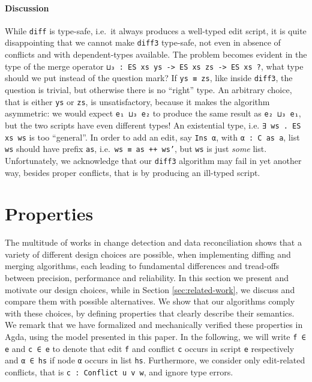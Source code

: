 \documentclass{sigplanconf}
\theoremstyle{plain}
\begin{document}

\paragraph{Discussion}
While \texttt{diff} is type-safe, i.e.\ it always produces a
well-typed edit script, it is quite disappointing that we cannot make
\texttt{diff3} type-safe, not even in absence of conflicts and with
dependent-types available.
%
The problem becomes evident in the type of the merge operator
\texttt{⊔₃ : ES xs ys -> ES xs zs -> ES xs ?}, what type should we put
instead of the question mark?
%
If \texttt{ys ≡ zs}, like inside \texttt{diff3}, the question is
trivial, but otherwise there is no ``right'' type.
%
An arbitrary choice, that is either \texttt{ys} or \texttt{zs}, is
unsatisfactory, because it makes the algorithm asymmetric: we would
expect \texttt{e₁ ⊔₃ e₂} to produce the same result as \texttt{e₂ ⊔₃
  e₁}, but the two scripts have even different types!
%
An existential type, i.e. \texttt{∃ ws . ES xs ws} is too ``general''.
In order to add an edit, say \texttt{Ins α}, with \texttt{α : C as a},
list \texttt{ws} should have prefix \texttt{as}, i.e.\ \texttt{ws ≡ as
  ++ ws'}, but \texttt{ws} is just \emph{some} list.
%
Unfortunately, we acknowledge that our \texttt{diff3} algorithm may
fail in yet another way, besides proper conflicts, that is by
producing an ill-typed script.

\section{Properties}
\label{sec:properties}
%
The multitude of works in change detection and data reconciliation
\cite{Pierce98, Ramsey01, UnisonSpec, PetersSurvey, Pierce07, Mens02,
  Chawathe96} shows that a variety of different design choices are
possible, when implementing diffing and merging algorithms, each
leading to fundamental differences and tread-offs between precision,
performance and reliability.
%
In this section we present and motivate our design choices, while in
Section \ref{sec:related-work}, we discuss and compare them with
possible alternatives.
%
We show that our algorithms comply with these choices, by defining
properties that clearly describe their semantics.
%
We remark that we have formalized and mechanically verified these
properties in Agda, using the model presented in this paper.
%
In the following, we will write \texttt{f ∈ e} and \texttt{c ∈ e} to
denote that edit \texttt{f} and conflict \texttt{c} occurs in script
\texttt{e} respectively and \texttt{α ∈ hs} if node \texttt{α}
occurs in list \texttt{hs}.
%
Furthermore, we consider only edit-related conflicts, that is
\texttt{c : Conflict u v w}, and ignore type errors.
  
\end{document}
